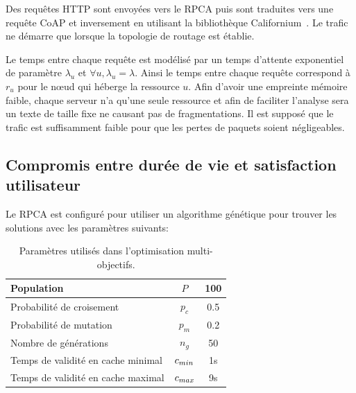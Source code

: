 Des requêtes \ac{HTTP} sont envoyées vers le \ac{RPCA} puis sont traduites vers une requête \ac{CoAP} et inversement en utilisant la bibliothèque Californium~\cite{kovatsch2014californium}.
Le trafic ne démarre que lorsque la topologie de routage est établie.

Le temps entre chaque requête est modélisé par un temps d'attente exponentiel de paramètre $\lambda_u$ et $\forall u, \lambda_u = \lambda$.
Ainsi le temps entre chaque requête correspond à $r_u$ pour le nœud qui héberge la ressource $u$.
Afin d'avoir une empreinte mémoire faible, chaque serveur n'a qu'une seule ressource et afin de faciliter l'analyse sera un texte de taille fixe ne causant pas de fragmentations.
Il est supposé que le trafic est suffisamment faible pour que les pertes de paquets soient négligeables.

\subsection{Compromis entre durée de vie et satisfaction utilisateur}

Le \ac{RPCA} est configuré pour utiliser un algorithme génétique pour trouver les solutions avec les paramètres suivants:

\begin{table}[ht]
\centering
\begin{tabular}{|l|c|c|}
\hline
Population & $P$ & 100 \\
\hline
Probabilité de croisement & $p_c$ & 0.5 \\
\hline
Probabilité de mutation & $p_m$ & 0.2 \\
\hline
Nombre de générations & $n_g$ & 50 \\
\hline
Temps de validité en cache minimal & $c_{min}$ & 1s \\
\hline
Temps de validité en cache maximal & $c_{max}$ & 9s \\
\hline
\end{tabular}
\caption{Paramètres utilisés dans l'optimisation multi-objectifs.}

\label{cache:table:nsga2_parameters}
\end{table}


